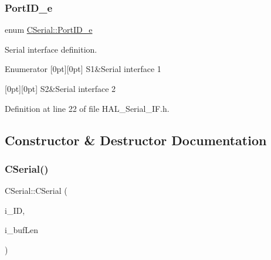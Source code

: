 \subsubsection{\texorpdfstring{PortID\_e}{PortID\_e}}
{\footnotesize\ttfamily enum \mbox{\hyperlink{class_c_serial_a000039540cc90b18bafacf5744e7eda2}{C\+Serial\+::\+Port\+I\+D\+\_\+e}}}



Serial interface definition. 

\begin{DoxyEnumFields}{Enumerator}
[0pt][0pt]{}\mbox{\label{class_c_serial_a000039540cc90b18bafacf5744e7eda2a2a245d3c55e5b6e7052daf261924ce08}} 
S1&Serial interface 1 \\
\hline

[0pt][0pt]{}\mbox{\label{class_c_serial_a000039540cc90b18bafacf5744e7eda2a8cc95f4591147b0df028e003f82220a1}} 
S2&Serial interface 2 \\
\hline

\end{DoxyEnumFields}


Definition at line 22 of file H\+A\+L\+\_\+\+Serial\+\_\+\+I\+F.\+h.



\subsection{Constructor \& Destructor Documentation}
\mbox{\label{class_c_serial_a3b2b31de1529b884b8d5e354586ee981}} 
\subsubsection{\texorpdfstring{CSerial()}{CSerial()}}
{\footnotesize\ttfamily C\+Serial\+::\+C\+Serial (\begin{DoxyParamCaption}\item[{\mbox{\hyperlink{class_c_serial_a000039540cc90b18bafacf5744e7eda2}{Port\+I\+D\+\_\+e}}}]{i\+\_\+\+ID,  }\item[{\mbox{\hyperlink{_a_d_a_s___types_8h_a1f1825b69244eb3ad2c7165ddc99c956}{uint16\+\_\+t}}}]{i\+\_\+buf\+Len }\end{DoxyParamCaption})}



